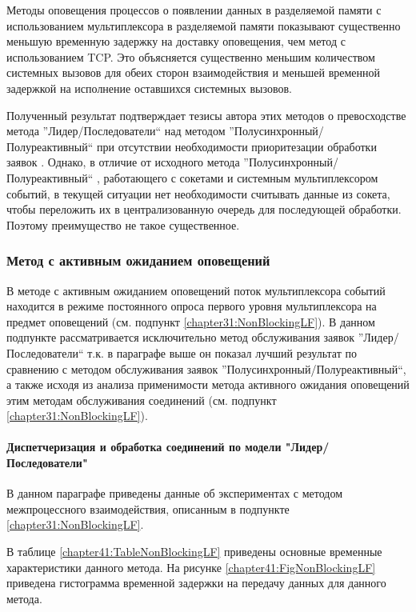 Методы оповещения процессов о появлении данных в разделяемой памяти с использованием мультиплексора в разделяемой памяти показывают существенно меньшую временную задержку на доставку оповещения, чем метод с использованием TCP. Это объясняется существенно меньшим количеством системных вызовов для обеих сторон взаимодействия и меньшей временной задержкой на исполнение оставшихся системных вызовов.

Полученный результат подтверждает тезисы автора этих методов о превосходстве метода ''Лидер/Последователи`` над методом ''Полусинхронный/Полуреактивный`` при отсутствии необходимости приоритезации обработки заявок \cite[398]{schmidt2013pattern}. Однако, в отличие от исходного метода ''Полусинхронный/Полуреактивный`` \cite[375]{schmidt2013pattern}, работающего с сокетами и системным мультиплексором событий, в текущей ситуации нет необходимости считывать данные из сокета, чтобы переложить их в централизованную очередь для последующей обработки. Поэтому преимущество не такое существенное.

\subsubsection{Метод с активным ожиданием оповещений}

В методе с активным ожиданием оповещений поток мультиплексора событий находится в режиме постоянного опроса первого уровня мультиплексора на предмет оповещений (см. подпункт \ref{chapter31:NonBlockingLF}). В данном подпункте рассматривается исключительно метод обслуживания заявок ''Лидер/Последователи`` т.к. в параграфе выше он показал лучший результат по сравнению с методом обслуживания заявок ''Полусинхронный/Полуреактивный``, а также исходя из анализа применимости метода активного ожидания оповещений этим методам обслуживания соединений (см. подпункт \ref{chapter31:NonBlockingLF}).

\paragraph{Диспетчеризация и обработка соединений по модели "Лидер/Последователи"}

В данном параграфе приведены данные об экспериментах с методом межпроцессного взаимодействия, описанным в подпункте \ref{chapter31:NonBlockingLF}.

В таблице \ref{chapter41:TableNonBlockingLF} приведены основные временные характеристики данного метода. На рисунке \ref{chapter41:FigNonBlockingLF} приведена гистограмма временной задержки на передачу данных для данного метода.

